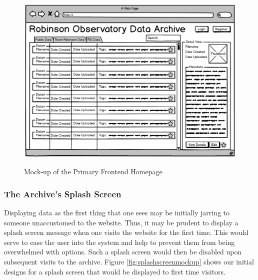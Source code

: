 \documentclass[12pt]{report}
\begin{document}
\begin{figure}[h]
	\centering
	\caption{Mock-up of the Primary Frontend Homepage}
	\includegraphics[width=\linewidth]{frontend_mockup}
	\label{fig:frontendmockup}
\end{figure}

\subsubsection*{The Archive's Splash Screen}

Displaying data as the first thing that one sees may be initially jarring to someone unaccustomed to the website. Thus, it may be prudent to display a splash screen message when one visits the website for the first time. This would serve to ease the user into the system and help to prevent them from being overwhelmed with options. Such a splash screen would then be disabled upon subsequent visits to the archive. Figure \ref{fig:splashscreenmockup} shows our initial designs for a splash screen that would be displayed to first time visitors.
\end{document}

